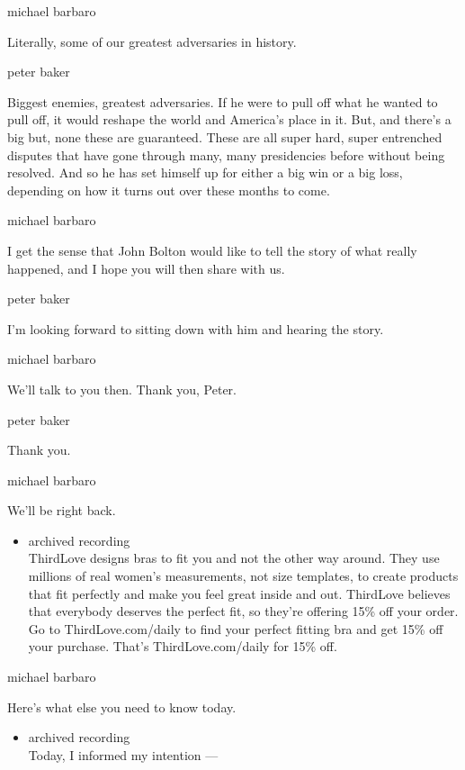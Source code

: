 michael barbaro

Literally, some of our greatest adversaries in history.

peter baker

Biggest enemies, greatest adversaries. If he were to pull off what he
wanted to pull off, it would reshape the world and America's place in
it. But, and there's a big but, none these are guaranteed. These are all
super hard, super entrenched disputes that have gone through many, many
presidencies before without being resolved. And so he has set himself up
for either a big win or a big loss, depending on how it turns out over
these months to come.

michael barbaro

I get the sense that John Bolton would like to tell the story of what
really happened, and I hope you will then share with us.

peter baker

I'm looking forward to sitting down with him and hearing the story.

michael barbaro

We'll talk to you then. Thank you, Peter.

peter baker

Thank you.

michael barbaro

We'll be right back.

\begin{itemize}
\tightlist
\item
  archived recording\\
  ThirdLove designs bras to fit you and not the other way around. They
  use millions of real women's measurements, not size templates, to
  create products that fit perfectly and make you feel great inside and
  out. ThirdLove believes that everybody deserves the perfect fit, so
  they're offering 15\% off your order. Go to ThirdLove.com/daily to
  find your perfect fitting bra and get 15\% off your purchase. That's
  ThirdLove.com/daily for 15\% off.
\end{itemize}

michael barbaro

Here's what else you need to know today.

\begin{itemize}
\tightlist
\item
  archived recording\\
  Today, I informed my intention ---
\end{itemize}

